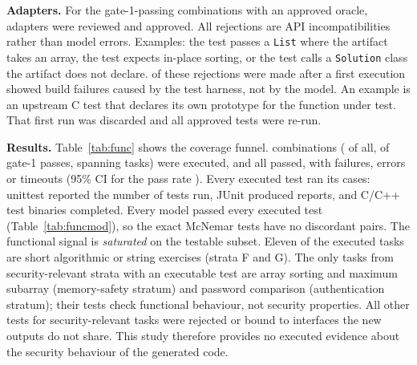 \documentclass[conference]{IEEEtran}
\begin{document}
\begin{table}[t]
\caption{Review outcome of proposed reference tests}
\label{tab:oracles}
\centering\footnotesize

\end{table}

\textbf{Adapters.} For the \nFuncOracleOk{} gate-1-passing combinations with an
approved oracle, \nAdapterReviewed{} adapters were reviewed and
\nAdapterApproved{} approved. All rejections are API incompatibilities rather
than model errors. Examples: the test passes a \texttt{List} where the artifact
takes an array, the test expects in-place sorting, or the test calls a
\texttt{Solution} class the artifact does not declare. \nAdapterPostExec{} of
these rejections were made after a first execution showed build failures caused
by the test harness, not by the model. An example is an upstream C test that
declares its own prototype for the function under test. That first run was
discarded and all approved tests were re-run.

\textbf{Results.} Table~\ref{tab:func} shows the coverage funnel.
\nFuncExecuted{} combinations (\pFuncCoverage{} of all, \pFuncCoverageGOne{} of
gate-1 passes, spanning \nFuncTasks{} tasks) were executed, and all
\nFuncPassed{} passed, with \nFuncFailed{} failures, errors or timeouts (95\% CI
for the pass rate \ciFuncPass{}). Every executed test ran its cases: unittest
reported the number of tests run, JUnit produced reports, and C/C++ test
binaries completed. Every model passed every executed test
(Table~\ref{tab:funcmod}), so the exact McNemar tests have no discordant pairs.
The functional signal is \emph{saturated} on the testable subset. Eleven of the
\nFuncTasks{} executed tasks are short algorithmic or string exercises (strata F
and G). The only tasks from security-relevant strata with an executable test
are array sorting and maximum subarray (memory-safety stratum) and password
comparison (authentication stratum); their tests check functional behaviour,
not security properties. All other tests for security-relevant tasks were
rejected or bound to interfaces the new outputs do not share. This study
therefore provides no executed evidence about the security behaviour of the
generated code.

\begin{table}[t]
\caption{Functional-testing coverage funnel}
\label{tab:func}
\centering\footnotesize

\end{table}

\begin{table}[t]
\caption{Functional tests passed / executed, by model and language}
\label{tab:funcmod}
\centering\footnotesize

\end{table}
\end{document}
